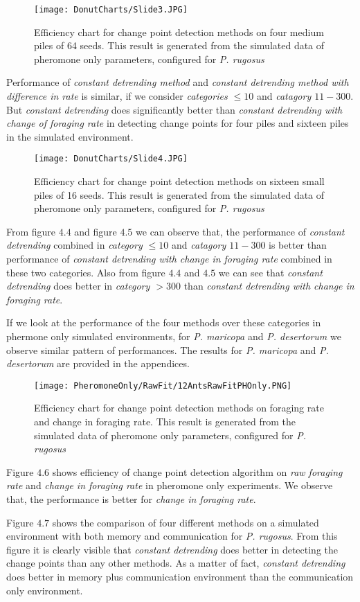 \begin{figure}[H]
	\texttt{[image: DonutCharts/Slide3.JPG]}
	\caption{Efficiency chart for change point detection methods on four medium  piles of 64 seeds. This result is generated from the simulated data of pheromone only parameters, configured for \textit{P. rugosus}}
\end{figure}
Performance of \textit{constant detrending method} and \textit{constant detrending method with difference in rate} is similar, if we consider \textit{categories $\le 10$} and \textit{catagory $11-300$}. But \textit{constant detrending} does significantly better than \textit{constant detrending with change of foraging rate} in detecting change points for four piles and sixteen piles in the simulated environment.\par
\begin{figure}[H]
	\texttt{[image: DonutCharts/Slide4.JPG]}
	\caption{Efficiency chart for change point detection methods on sixteen small piles of 16 seeds. This result is generated from the simulated data of pheromone only parameters, configured for \textit{P. rugosus}}
\end{figure}
From figure $4.4$ and figure $4.5$ we can observe that, the performance of \textit{constant detrending} combined in \textit{category $\le 10$} and \textit{catagory $11-300$} is better than performance of \textit{constant detrending with change in foraging rate} combined in these two categories. Also from figure $4.4$ and $4.5$ we can see that \textit{constant detrending} does better in \textit{category $>300$} than \textit{constant detrending with change in foraging rate}. \par
If we look at the performance of the four methods over these categories in phermone only simulated environments, for \textit{P. maricopa} and \textit{P. desertorum} we observe similar pattern of performances. The results for \textit{P. maricopa} and \textit{P. desertorum} are provided in the appendices.\par  
\begin{figure}[]
	\texttt{[image: PheromoneOnly/RawFit/12AntsRawFitPHOnly.PNG]}
	\caption{Efficiency chart for change point detection methods on foraging rate and change in foraging rate. This result is generated from the simulated data of pheromone only parameters, configured for \textit{P. rugosus}}
\end{figure}
Figure $4.6$ shows efficiency of change point detection algorithm on \textit{raw foraging rate} and \textit{change in foraging rate} in pheromone only experiments. We observe that, the performance is better for \textit{change in foraging rate}. \par
Figure $4.7$ shows the comparison of four different methods on a simulated environment with both memory and communication for \textit{P. rugosus}. From this figure it is clearly visible that \textit{constant detrending} does better in detecting the change points than any other methods. As a matter of fact, \textit{constant detrending} does better in memory plus communication environment than the communication only environment.\par 

